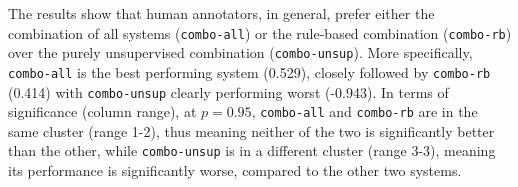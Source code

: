 \documentclass[free]{flammie}
\begin{document}







The results show that human annotators, in general, prefer either the combination of all systems (\texttt{combo-all}) or the rule-based combination (\texttt{combo-rb}) over the purely unsupervised combination (\texttt{combo-unsup}).
More specifically, \texttt{combo-all} is the best performing system (0.529), closely followed by \texttt{combo-rb} (0.414) with \texttt{combo-unsup} clearly performing worst (-0.943).
In terms of significance (column range), at $p=0.95$, \texttt{combo-all} and \texttt{combo-rb} are in the same cluster (range 1-2), thus meaning neither of the two is significantly better than the other, while \texttt{combo-unsup} is in a different cluster (range 3-3), meaning its performance is significantly worse, compared to the other two systems.
\end{document}

